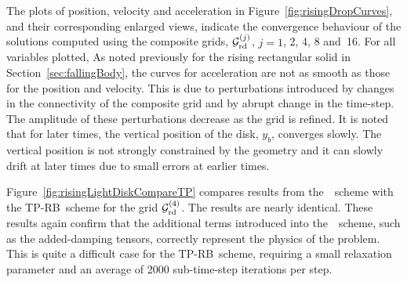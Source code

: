 The plots of position, velocity and acceleration in Figure~\ref{fig:risingDropCurves}, and their corresponding
enlarged views, indicate the
convergence behaviour of the solutions computed using the composite grids, ${\mathcal G}_{\rm{rd}}^{(j)}$, $j=1$, 2, 4, 8 and~16.
For all variables plotted, 
As noted previously for the rising rectangular solid in Section~\ref{sec:fallingBody}, the curves for acceleration are not as smooth as those for the position and velocity.
This is due to perturbations introduced by changes in the connectivity of the composite grid and by abrupt change in the time-step.  The amplitude of these perturbations decrease as the grid is refined.
It is noted that for later times, the vertical position of the disk, $y_b$, converges  slowly.
The vertical position is not strongly constrained by the geometry and it can slowly drift at later times due to small errors
at earlier times. 





Figure~\ref{fig:risingLightDiskCompareTP} compares results from the~\ampRB~scheme with the TP-RB~scheme
for the grid ${\mathcal G}_{\rm{rd}}^{(4)}$.  The results are nearly
identical. These results again confirm that the additional terms introduced into the~\ampRB~scheme, such as the added-damping tensors,
correctly represent the physics of the problem. This is quite a difficult case for the TP-RB~scheme, requiring a small relaxation parameter and
an average of 2000 sub-time-step iterations per step.







